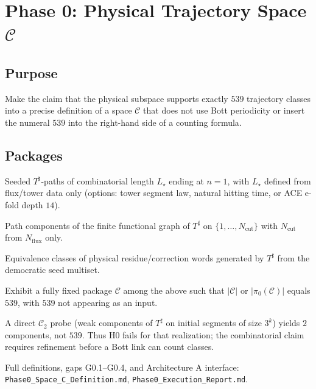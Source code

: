 \chapter{Phase 0: Physical Trajectory Space \(\mathcal{C}\)}
\label{ch:phase0-C}

\section{Purpose}

Make the claim that the physical subspace supports exactly \(539\) trajectory
classes into a precise definition of a space \(\mathcal{C}\) that does not use
Bott periodicity or insert the numeral \(539\) into the right-hand side of a
counting formula.

\section{Packages}

\begin{definition}
Seeded \(T^\sharp\)-paths of combinatorial length \(L_\star\) ending at \(n=1\),
with \(L_\star\) defined from flux/tower data only (options: tower segment law,
natural hitting time, or ACE e-fold depth \(14\)).
\end{definition}

\begin{definition}
Path components of the finite functional graph of \(T^\sharp\) on
\(\{1,\ldots,N_{\mathrm{cut}}\}\) with \(N_{\mathrm{cut}}\) from
\(N_{\mathrm{flux}}\) only.
\end{definition}

\begin{definition}
Equivalence classes of physical residue/correction words generated by
\(T^\sharp\) from the democratic seed multiset.
\end{definition}

\begin{openproblem}[Claim H0]
Exhibit a fully fixed package \(\mathcal{C}\) among the above such that
\(|\mathcal{C}|\) or \(|\pi_0(\mathcal{C})|\) equals \(539\), with \(539\) not
appearing as an input.
\end{openproblem}

\begin{remark}
A direct \(\mathcal{C}_2\) probe (weak components of \(T^\sharp\) on initial
segments of size \(3^{k}\)) yields \(2\) components, not \(539\). Thus H0 fails
for that realization; the combinatorial claim requires refinement before a Bott
link can count classes.
\end{remark}

Full definitions, gaps G0.1--G0.4, and Architecture A interface:
\texttt{Phase0\_Space\_C\_Definition.md}, \texttt{Phase0\_Execution\_Report.md}.

